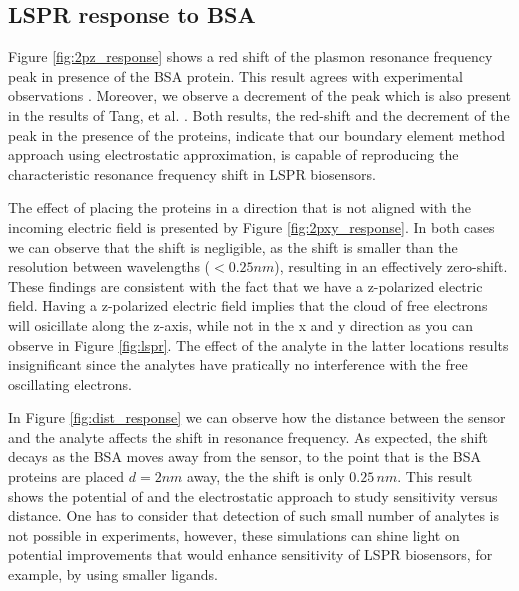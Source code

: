 


\subsection{LSPR response to BSA}

Figure \ref{fig:2pz_response} shows a red shift of the plasmon resonance frequency peak in presence of the BSA protein.
This result agrees with experimental observations
\cite{TangETal2010, RaphaelETal2013}. Moreover, we observe a decrement of 
the peak which is also present in the results of Tang, et al. \cite{TangETal2010}.
Both results, the red-shift and the decrement of the peak in the presence of 
the proteins, indicate that our boundary element method approach using electrostatic
approximation, is capable of reproducing the characteristic resonance frequency 
shift in LSPR biosensors.

The effect of placing the proteins in a direction that is not aligned with the incoming electric field
is presented by Figure \ref{fig:2pxy_response}. In both cases we can observe that the shift is negligible, 
as the shift is smaller than the resolution between wavelengths ($< 0.25 nm$), resulting in an
effectively zero-shift. These findings are consistent with 
the fact that we have a z-polarized electric field. Having a z-polarized electric
field implies that the cloud of free electrons will osicillate along the z-axis, while 
not in the x and y direction as you can observe in Figure \ref{fig:lspr}. The
effect of the analyte in the latter locations results insignificant since the 
analytes have pratically no interference with the free oscillating electrons. 

In Figure \ref{fig:dist_response} we can observe how the distance between the sensor 
and the analyte affects the shift in resonance frequency. As expected, the shift decays 
as the BSA moves away from the sensor, to the point that is the BSA proteins are placed
$d=2 nm$ away, the the shift is only $0.25 \, nm$. This result shows the potential of \pygbe 
and the electrostatic approach to study sensitivity versus distance.
One has to consider that detection of such
small number of analytes is not possible in experiments, however, these simulations can shine light on
potential improvements that would enhance sensitivity of LSPR biosensors, for example, by using
smaller ligands. 



